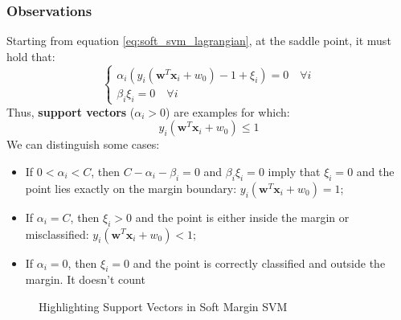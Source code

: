 \subsubsection{Observations}
Starting from equation \ref{eq:soft_svm_lagrangian}, at the saddle point, it must hold that:
\begin{equation}
    \begin{cases}
        \alpha_i(y_i (\boldsymbol{w}^T \boldsymbol{x}_i + w_0) - 1 + \xi_i) = 0 \quad \forall i \\
        \beta_i \xi_i = 0 \quad \forall  i
    \end{cases}
\end{equation}
Thus, \textbf{support vectors} ($\alpha_i > 0$) are examples for which:
\begin{equation}
    y_i (\boldsymbol{w}^T \boldsymbol{x}_i + w_0) \leq 1
\end{equation}
We can distinguish some cases:
\begin{itemize}
    \item If $0 < \alpha_i < C$, then $C - \alpha_i - \beta_i = 0$ and $\beta_i \xi_i = 0$ imply that $\xi_i = 0$ and the point lies exactly on the margin boundary: $y_i (\boldsymbol{w}^T \boldsymbol{x}_i + w_0) = 1$;
    \item If $\alpha_i = C$, then $\xi_i > 0$ and the point is either inside the margin or misclassified: $y_i (\boldsymbol{w}^T \boldsymbol{x}_i + w_0) < 1$;
    \item If $\alpha_i = 0$, then $\xi_i = 0$ and the point is correctly classified and outside the margin. It doesn't count
\end{itemize}
\begin{figure}[H]
    \label{fig:svm_soft_support_vectors}
    \caption{Highlighting Support Vectors in Soft Margin SVM}
\end{figure}


